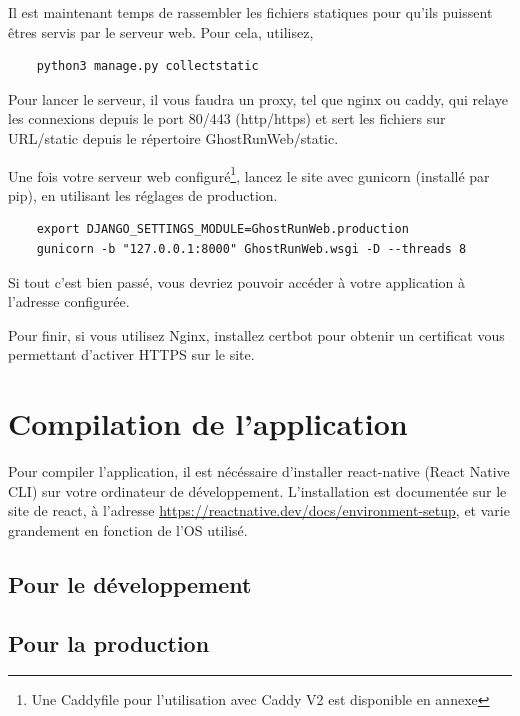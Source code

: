 Il est maintenant temps de rassembler les fichiers statiques pour qu'ils puissent êtres servis par le serveur web. Pour cela, utilisez,

\begin{verbatim}
    python3 manage.py collectstatic
\end{verbatim}

Pour lancer le serveur, il vous faudra un proxy, tel que nginx ou caddy, qui relaye les connexions depuis le port 80/443 (http/https) et sert les fichiers sur URL/static depuis le répertoire GhostRunWeb/static.

Une fois votre serveur web configuré\footnote{Une Caddyfile pour l'utilisation avec Caddy V2 est disponible en annexe}, lancez le site avec gunicorn (installé par pip), en utilisant les réglages de production.

\begin{verbatim}
    export DJANGO_SETTINGS_MODULE=GhostRunWeb.production
    gunicorn -b "127.0.0.1:8000" GhostRunWeb.wsgi -D --threads 8
\end{verbatim}

Si tout c'est bien passé, vous devriez pouvoir accéder à votre application à l'adresse configurée.

Pour finir, si vous utilisez Nginx, installez certbot pour obtenir un certificat vous permettant d'activer HTTPS sur le site.


\section{Compilation de l'application}

Pour compiler l'application, il est nécéssaire d'installer react-native (React Native CLI) sur votre ordinateur de développement. L'installation est documentée sur le site de react, à l'adresse \url{https://reactnative.dev/docs/environment-setup}, et varie grandement en fonction de l'OS utilisé.

\subsection{Pour le développement}

\subsection{Pour la production}


